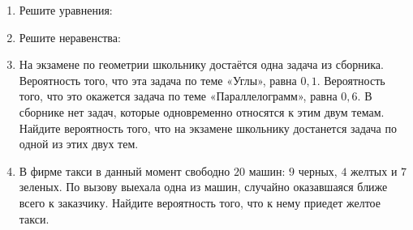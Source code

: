 \documentclass[12pt, a4paper]{article}
\begin{document}
	
	\begin{enumerate}
		\item Решите уравнения:
			\begin{enumerate}[label=\asbuk*)]
			\end{enumerate}
		\item Решите неравенства: 
		\begin{enumerate}[label=\asbuk*)]
		\end{enumerate}
	\item На экзамене по геометрии школьнику достаётся одна задача из сборника. Вероятность того, что эта задача по теме «Углы», равна $0,1$. Вероятность того, что это окажется задача по теме «Параллелограмм», равна $0,6$. В сборнике нет задач, которые одновременно относятся к этим двум темам. Найдите вероятность того, что на экзамене школьнику достанется задача по одной из этих двух тем.
	\item В фирме такси в данный момент свободно $20$ машин: $9$ черных, $4$ желтых и $7$ зеленых. По вызову выехала одна из машин, случайно оказавшаяся ближе всего к заказчику. Найдите вероятность того, что к нему приедет желтое такси.
	\end{enumerate}
\end{document}
